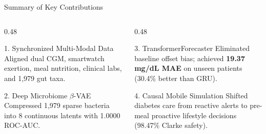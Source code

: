 \documentclass[aspectratio=169, 10pt]{beamer}
\begin{document}
\begin{frame}{Summary of Key Contributions}
  \begin{columns}[c]
    \begin{column}{0.48\textwidth}
      \begin{block}{1. Synchronized Multi-Modal Data}
        Aligned dual CGM, smartwatch exertion, meal nutrition, clinical labs, and 1,979 gut taxa.
      \end{block}
      
      \vspace{0.2cm}
      \begin{block}{2. Deep Microbiome $\beta$-VAE}
        Compressed 1,979 sparse bacteria into 8 continuous latents with 1.0000 ROC-AUC.
      \end{block}
    \end{column}
    
    \begin{column}{0.48\textwidth}
      \begin{block}{3. TransformerForecaster}
        Eliminated baseline offset bias; achieved \textbf{19.37 mg/dL MAE} on unseen patients (30.4\% better than GRU).
      \end{block}
      
      \vspace{0.2cm}
      \begin{block}{4. Causal Mobile Simulation}
        Shifted diabetes care from reactive alerts to pre-meal proactive lifestyle decisions (98.47\% Clarke safety).
      \end{block}
    \end{column}
  \end{columns}
\end{frame}
\end{document}
